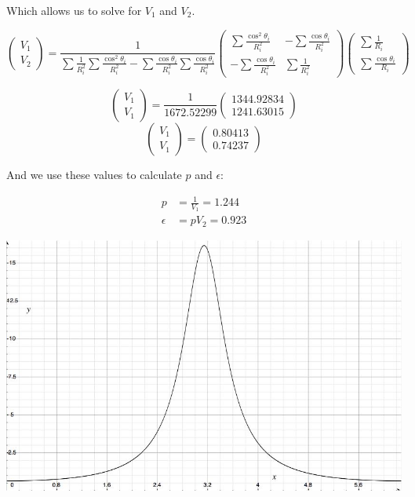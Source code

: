 \documentclass{article}
\begin{document}
\begin{enumerate}[(a)]
    Which allows us to solve for $V_1$ and $V_2$.

    \[
      \begin{pmatrix}
        V_1 \\ V_2
      \end{pmatrix}
      =
      \frac{1}{\sum\frac{1}{R_i^2}\sum\frac{\cos^2\theta_i}{R_i^2} - \sum\frac{\cos\theta_i}{R_i^2}\sum\frac{\cos\theta_i}{R_i^2}}
      \begin{pmatrix}
        \sum\frac{\cos^2\theta_i}{R_i^2} & -\sum\frac{\cos\theta_i}{R_i^2} \\
        -\sum\frac{\cos\theta_i}{R_i^2} & \sum\frac{1}{R_i^2}
      \end{pmatrix}
      \begin{pmatrix}
        \sum\frac{1}{R_i} \\ \sum\frac{\cos\theta_i}{R_i}
      \end{pmatrix}
    \]

    \[
      \begin{pmatrix}
        V_1 \\ V_1
      \end{pmatrix}
      =
      \frac{1}{1672.52299}
      \begin{pmatrix}
        1344.92834 \\ 1241.63015
      \end{pmatrix}
    \]
    \[
      \begin{pmatrix}
        V_1 \\ V_1
      \end{pmatrix}
      =
      \begin{pmatrix}
        0.80413 \\ 0.74237
      \end{pmatrix}
    \]

    And we use these values to calculate $p$ and $\epsilon$:

    \begin{align*}
      p &= \frac{1}{V_1} = 1.244 \\
      \epsilon &= pV_2 = 0.923
    \end{align*}
    
    \includegraphics[width=\textwidth]{graph-d.jpg}


\end{enumerate}
\end{document}
